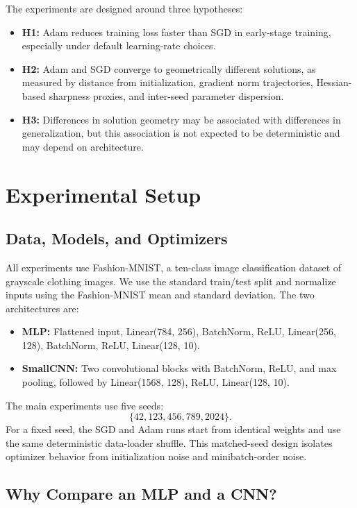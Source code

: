 \documentclass[11pt]{article}
\begin{document}
The experiments are designed around three hypotheses:
\begin{itemize}
    \item \textbf{H1:} Adam reduces training loss faster than SGD in early-stage training, especially under default learning-rate choices.
    \item \textbf{H2:} Adam and SGD converge to geometrically different solutions, as measured by distance from initialization, gradient norm trajectories, Hessian-based sharpness proxies, and inter-seed parameter dispersion.
    \item \textbf{H3:} Differences in solution geometry may be associated with differences in generalization, but this association is not expected to be deterministic and may depend on architecture.
\end{itemize}

\section{Experimental Setup}

\subsection{Data, Models, and Optimizers}

All experiments use Fashion-MNIST, a ten-class image classification dataset of grayscale clothing images. We use the standard train/test split and normalize inputs using the Fashion-MNIST mean and standard deviation. The two architectures are:
\begin{itemize}
    \item \textbf{MLP:} Flattened input, Linear(784, 256), BatchNorm, ReLU, Linear(256, 128), BatchNorm, ReLU, Linear(128, 10).
    \item \textbf{SmallCNN:} Two convolutional blocks with BatchNorm, ReLU, and max pooling, followed by Linear(1568, 128), ReLU, Linear(128, 10).
\end{itemize}

The main experiments use five seeds:
\[
\{42, 123, 456, 789, 2024\}.
\]
For a fixed seed, the SGD and Adam runs start from identical weights and use the same deterministic data-loader shuffle. This matched-seed design isolates optimizer behavior from initialization noise and minibatch-order noise.

\subsection{Why Compare an MLP and a CNN?}
\end{document}
